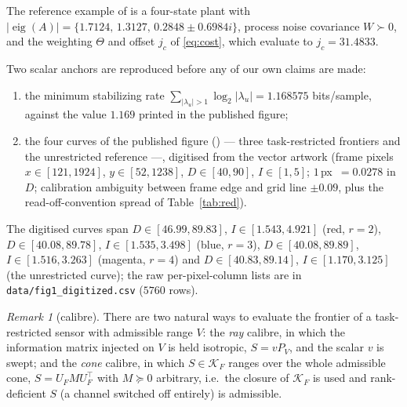 \documentclass[journal]{IEEEtran}
\theoremstyle{remark}
\newtheorem{remark}{Remark}
\begin{document}
The reference example of \cite{refpaper} is a four-state plant with
$|\operatorname{eig}(A)|=\{1.7124,\,1.3127,\,0.2848\pm0.6984i\}$, process noise
covariance $W\succ0$, and the weighting $\Theta$ and offset $j_c$ of
\eqref{eq:cost}, which evaluate to $j_c=31.4833$.

Two scalar anchors are reproduced before any of our own claims are made:

\begin{enumerate}
 \item the minimum stabilizing rate $\sum_{|\lambda_u|>1}\log_2|\lambda_u|
 = 1.168575$ bits/sample, against the value $1.169$ printed in the
 published figure;
 \item the four curves of the published figure (\cite[Fig.~1]{refpaper}) ---
 three task-restricted frontiers and the
 unrestricted reference ---, digitised from the
 vector artwork (frame pixels $x\in[121,1924]$, $y\in[52,1238]$,
 $D\in[40,90]$, $I\in[1,5]$; $1$\,px~$=0.0278$ in $D$; calibration
 ambiguity between frame edge and grid line $\pm0.09$, plus the
 read-off-convention spread of Table~\ref{tab:red}).
\end{enumerate}

The digitised curves span $D\in[46.99,89.83]$, $I\in[1.543,4.921]$ (red,
$r=2$), $D\in[40.08,89.78]$, $I\in[1.535,3.498]$ (blue, $r=3$),
$D\in[40.08,89.89]$, $I\in[1.516,3.263]$ (magenta, $r=4$) and
$D\in[40.83,89.14]$, $I\in[1.170,3.125]$ (the unrestricted curve); the raw
per-pixel-column lists are in \texttt{data/fig1\_digitized.csv} ($5760$ rows).

\begin{remark}[calibre]
\label{rmk:calibre}
There are two natural ways to evaluate the frontier of a task-restricted sensor
with admissible range $V$: the \emph{ray} calibre, in which the information
matrix injected on $V$ is held isotropic, $S=vP_V$, and the scalar $v$ is
swept; and the \emph{cone} calibre,
in which $S\in\mathcal K_F$ ranges over the whole admissible cone,
$S=U_F M U_F^{\top}$ with $M\succeq0$ arbitrary, i.e.\ the closure of
$\mathcal K_F$ is used and rank-deficient $S$ (a channel switched off entirely)
is admissible. 
\end{remark}
\end{document}
